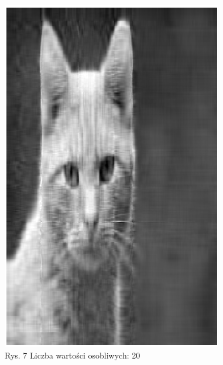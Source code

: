 \documentclass{article}
\begin{document}
\begin{figure}[!htb]
        \begin{minipage}{0.48\textwidth}
          \centering
          \includegraphics[width=.8\linewidth]{20.png}
          \caption*{Rys. 7 Liczba wartości osobliwych: 20}
        \end{minipage}\hfill
        \begin{minipage}{0.48\textwidth}
          \centering

\end{minipage}
\end{figure}
\end{document}
